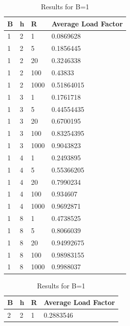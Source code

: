 \documentclass[11pt]{article}
\begin{document}
\begin{table}
\parbox{.45\linewidth}{
\centering
\small
\begin{tabular}{|l|l|l|l|}
\hline
\textbf{B} & \textbf{h} & \textbf{R} & \textbf{Average Load Factor}\\ \hline
1          & 2          & 1        &0.0869628 \\ \hline
1          & 2          & 5        &0.1856445 \\ \hline
1          & 2          & 20        &0.3246338 \\ \hline
1          & 2          & 100        &0.43833 \\ \hline
1          & 2          & 1000        &0.51864015 \\ \hline
1          & 3          & 1        &0.1761718 \\ \hline
1          & 3          & 5        &0.44554435 \\ \hline
1          & 3          & 20        &0.6700195 \\ \hline
1          & 3          & 100        &0.83254395 \\ \hline
1          & 3          & 1000        &0.9043823 \\ \hline
1          & 4          & 1        &0.2493895 \\ \hline
1          & 4          & 5        &0.55366205 \\ \hline
1          & 4          & 20        &0.7990234 \\ \hline
1          & 4          & 100        &0.934607 \\ \hline
1          & 4          & 1000        &0.9692871 \\ \hline
1          & 8          & 1        &0.4738525 \\ \hline
1          & 8          & 5        &0.8066039 \\ \hline
1          & 8          & 20        &0.94992675 \\ \hline
1          & 8          & 100        &0.98983155 \\ \hline
1          & 8          & 1000        &0.9988037 \\ \hline
\end{tabular}
\caption{Results for B=1}
}
\hfill
\parbox{.45\linewidth}{
\centering
\small
\begin{tabular}{|l|l|l|l|}
\hline
\textbf{B} & \textbf{h} & \textbf{R} & \textbf{Average Load Factor} \\ \hline
2          & 2          & 1        &0.2883546 \\ \hline

\end{tabular}}
\end{table}
\end{document}
